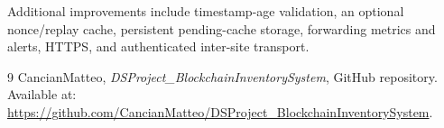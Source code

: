 \documentclass[11pt, a4paper, oneside]{memoir}
\begin{document}
Additional improvements include timestamp-age validation, an optional
nonce/replay cache, persistent pending-cache storage, forwarding metrics and
alerts, HTTPS, and authenticated inter-site transport.


\begin{thebibliography}{9}
    CancianMatteo,
    \textit{DSProject\_BlockchainInventorySystem},
    GitHub repository.
    Available at:
    \url{https://github.com/CancianMatteo/DSProject_BlockchainInventorySystem}.
\end{thebibliography}


\appendix
\end{document}
